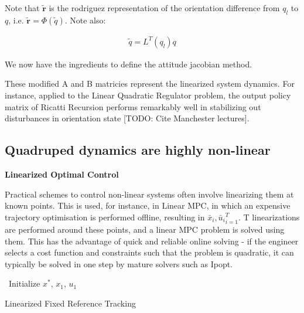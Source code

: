 \documentclass{article}
\begin{document}
Note that $\pmb{\tilde{r}}$ is the rodriguez representation of the orientation difference from $q_l$ to $q$, i.e. $\pmb{\tilde{r}} = \Phi(\tilde{q})$. Note also:

\begin{gather}
    \tilde{q} = L^T(q_l)q
\end{gather}

We now have the ingredients to define the attitude jacobian method.


These modified A and B matricies represent the linearized system dynamics. For instance, applied to the Linear Quadratic Regulator problem, the output policy matrix of Ricatti Recursion performs remarkably well in stabilizing out disturbances in orientation state [TODO: Cite Manchester lectures].

\subsection{Quadruped dynamics are highly non-linear}

\begin{center}
    \textbf{Linearized Optimal Control}
\end{center}

Practical schemes to control non-linear systems often involve linearizing them at known points. This is used, for instance, in Linear MPC, in which an expensive trajectory optimisation is performed offline, resulting in ${\bar{x}_i, \bar{u}_i}_{i=1}^{T}$. T linearizations are performed around these points, and a linear MPC problem is solved using them. This has the advantage of quick and reliable online solving - if the engineer selects a cost function and constraints such that the problem is quadratic, it can typically be solved in one step by mature solvers such as Ipopt.

\begin{algorithm}[H]

    \SetAlgoLined
    \init\ Initialize $x^*$, $x_1$, $u_1$ \\
    \caption{Linearized Fixed Reference Tracking}
    \label{algo:LFRT}
\end{algorithm}
\end{document}
